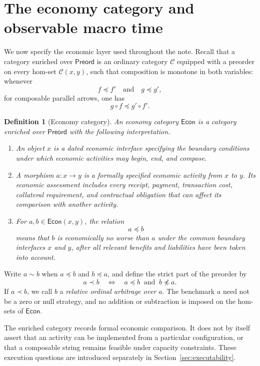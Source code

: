 \documentclass[11pt,a4paper]{article}
\newtheorem{definition}{Definition}[section]
\newcommand{\Econ}{\mathsf{Econ}}
\begin{document}
\section{The economy category and observable macro time}
\label{sec:economy-category}

We now specify the economic layer used throughout the note.  Recall that a
category enriched over \(\mathsf{Preord}\) is an ordinary category
\(\mathcal C\) equipped with a preorder on every hom-set
\(\mathcal C(x,y)\), such that composition is monotone in both variables:
whenever
\[
  f\preceq f'\quad\text{and}\quad g\preceq g',
\]
for composable parallel arrows, one has
\[
  g\circ f\preceq g'\circ f'.
\]

\begin{definition}[Economy category]
An \emph{economy category} \(\Econ\) is a category enriched over
\(\mathsf{Preord}\) with the following interpretation.
\begin{enumerate}[label=\textnormal{(\roman*)},leftmargin=10mm]
\item An object \(x\) is a dated economic interface specifying the boundary
conditions under which economic activities may begin, end, and compose.
\item A morphism \(a:x\to y\) is a formally specified economic activity from
\(x\) to \(y\).  Its economic assessment includes every receipt, payment,
transaction cost, collateral requirement, and contractual obligation that
can affect its comparison with another activity.
\item For \(a,b\in\Econ(x,y)\), the relation
\[
  a\preceq b
\]
means that \(b\) is economically no worse than \(a\) under the common
boundary interfaces \(x\) and \(y\), after all relevant benefits and
liabilities have been taken into account.
\end{enumerate}
\end{definition}

Write \(a\sim b\) when \(a\preceq b\) and \(b\preceq a\), and define the
strict part of the preorder by
\[
  a\prec b
  \quad\Longleftrightarrow\quad
  a\preceq b\ \text{ and }\ b\not\preceq a.
\]
If \(a\prec b\), we call \(b\) a \emph{relative ordinal arbitrage over}
\(a\).  The benchmark \(a\) need not be a zero or null strategy, and no
addition or subtraction is imposed on the hom-sets of \(\Econ\).

The enriched category records formal economic comparison.  It does not by
itself assert that an activity can be implemented from a particular
configuration, or that a composable string remains feasible under capacity
constraints.  These execution questions are introduced separately in
Section~\ref{sec:executability}.
\end{document}
